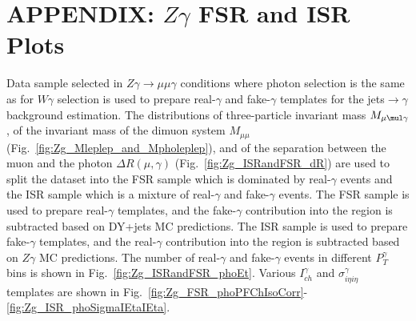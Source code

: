 \chapter{APPENDIX: $Z\gamma$ FSR and ISR Plots}
\label{sec:ZgFSRandISRplots}

Data sample selected in $Z\gamma\rightarrow\mu\mu\gamma$ conditions where photon selection is the same as for $W\gamma$ selection is used to prepare real-$\gamma$ and fake-$\gamma$ templates for the jets$\rightarrow\gamma$ background estimation. The distributions of three-particle invariant mass $M_{\mu\mul\gamma}$, of the invariant mass of the dimuon system $M_{\mu\mu}$ (Fig.~\ref{fig:Zg_Mleplep_and_Mpholeplep}), and of the separation between the muon and the photon $\Delta R(\mu,\gamma)$ (Fig.~\ref{fig:Zg_ISRandFSR_dR}) are used to split the dataset into the FSR sample which is dominated by real-$\gamma$ events and the ISR sample which is a mixture of real-$\gamma$ and fake-$\gamma$ events. The FSR sample is used to prepare real-$\gamma$ templates, and the fake-$\gamma$ contribution into the region is subtracted based on DY+jets MC predictions. The ISR sample is used to prepare fake-$\gamma$ templates, and the real-$\gamma$ contribution into the region is subtracted based on $Z\gamma$ MC predictions. The number of real-$\gamma$ and fake-$\gamma$ events in different $P_T^\gamma$ bins is shown in Fig.~\ref{fig:Zg_ISRandFSR_phoEt}. Various $I_{ch}^\gamma$ and $\sigma_{i \eta i \eta}^\gamma$ templates are shown in Fig.~\ref{fig:Zg_FSR_phoPFChIsoCorr}-\ref{fig:Zg_ISR_phoSigmaIEtaIEta}.


